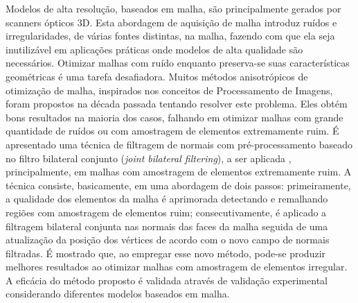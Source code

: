 Modelos de alta resolução, baseados em malha, são principalmente gerados por scanners ópticos 3D. Esta abordagem de aquisição de malha introduz ruídos e irregularidades, de várias fontes distintas, na malha, fazendo com que ela seja inutilizável em aplicações práticas onde modelos de alta qualidade são necessários. Otimizar malhas com ruído enquanto preserva-se suas características geométricas é uma tarefa desafiadora. Muitos métodos anisotrópicos de otimização de malha, inspirados nos conceitos de Processamento de Imagens, foram propostos na década passada tentando resolver este problema. Eles obtém bons resultados na maioria dos casos, falhando em otimizar malhas com grande quantidade de ruídos ou com amostragem de elementos extremamente ruim. É apresentado uma técnica de filtragem de normais com pré-processamento baseado no filtro bilateral conjunto (\textit{joint bilateral filtering}), a ser aplicada , principalmente, em malhas com amostragem de elementos extremamente ruim. A técnica consiste, basicamente, em uma abordagem de dois passos: primeiramente, a qualidade dos elementos da malha é aprimorada detectando e remalhando regiões com amostragem de elementos ruim; consecutivamente, é aplicado a filtragem bilateral conjunta nas normais das faces da malha seguida de uma atualização da posição dos vértices de acordo com o novo campo de normais filtradas. É mostrado que, ao empregar esse novo método, pode-se produzir melhores resultados ao otimizar malhas com amostragem de elementos irregular. A eficácia do método proposto é validada através de validação experimental considerando diferentes modelos baseados em malha. 
 


